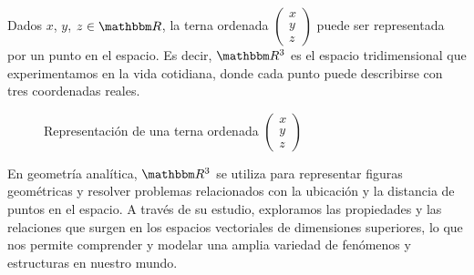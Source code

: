 Dados $x$, $y$, $z \in \RR$, la terna ordenada $\begin{pmatrix} x \\ y \\ z \end{pmatrix}$ puede ser representada por un punto en el espacio. Es decir, $\RR[3]$ es el espacio tridimensional que experimentamos en la vida cotidiana, donde cada punto puede describirse con tres coordenadas reales. 
\begin{figure}[h!]
    \centering 
    \caption{Representación de una terna ordenada $\begin{pmatrix} x \\ y \\ z \end{pmatrix}$}
\end{figure}

En geometría analítica, $\RR[3]$ se utiliza para representar figuras geométricas y resolver problemas relacionados con la ubicación y la distancia de puntos en el espacio. A través de su estudio, exploramos las propiedades y las relaciones que surgen en los espacios vectoriales de dimensiones superiores, lo que nos permite comprender y modelar una amplia variedad de fenómenos y estructuras en nuestro mundo.

